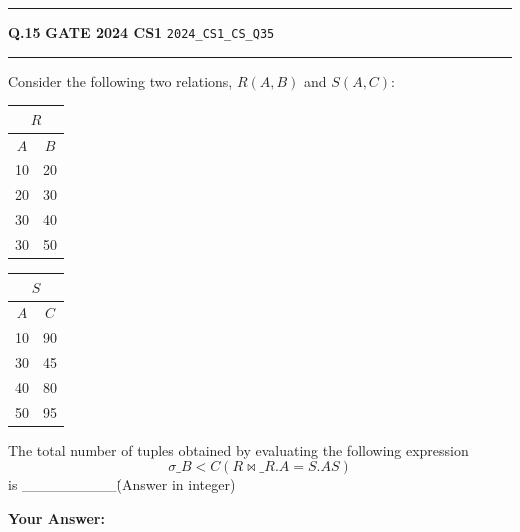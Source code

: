\documentclass[a4paper,10pt]{article}
\begin{document}
\vspace{6pt}\hrule height 0.35pt\vspace{6pt}
\noindent
\begin{tcolorbox}[
    blanker,
    sidebyside,
    sidebyside align=top,
    lefthand width=0.55\textwidth,
    top=4pt, bottom=4pt, left=0pt, right=0pt,
    middle=16pt,
    underlay={
        \draw[dashed, black!80, line width=0.8pt, dash pattern=on 4pt off 3pt]
            ([xshift=0.55\textwidth+8pt]frame.north west) --
            ([xshift=0.55\textwidth+8pt]frame.south west);
    }
]
\textbf{Q.15}  \hfill {\footnotesize\textbf{GATE 2024 CS1} \quad \tiny\texttt{2024\_CS1\_CS\_Q35}}
\vspace{2pt}\hrule height 0.3pt\vspace{4pt}

Consider the following two relations, $R(A,B)$ and $S(A,C)$:
\begin{center}
\begin{tabular}{|c|c|}
\multicolumn{2}{c}{$R$} \\
\hline
$A$ & $B$ \\
\hline
10 & 20 \\
20 & 30 \\
30 & 40 \\
30 & 50 \\
\hline
\end{tabular}
\qquad
\begin{tabular}{|c|c|}
\multicolumn{2}{c}{$S$} \\
\hline
$A$ & $C$ \\
\hline
10 & 90 \\
30 & 45 \\
40 & 80 \\
50 & 95 \\
\hline
\end{tabular}
\end{center}
The total number of tuples obtained by evaluating the following expression
\[ \sigma\_{B < C}(R \bowtie\_{R.A = S.A} S) \]
is \_\_\_\_\_\_\_\_\_\. (Answer in integer)

\par\vspace{6pt}\noindent\textbf{Your Answer:} \fbox{\rule{0pt}{1.3ex}\hspace{3cm}}

\tcblower


\end{tcolorbox}
\end{document}
